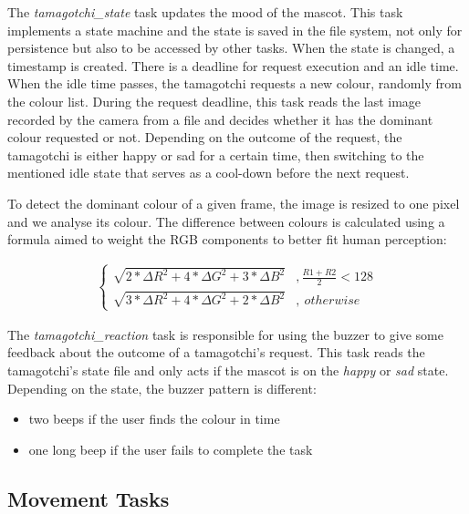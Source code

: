 \documentclass[conference]{IEEEtran}
\begin{document}
The \textit{tamagotchi\_state} task updates the mood of the mascot. This task implements a state machine and the state is saved in the file system, not only for persistence but also to be accessed by other tasks. When the state is changed, a timestamp is created. There is a deadline for request execution and an idle time. When the idle time passes, the tamagotchi requests a new colour, randomly from the colour list. During the request deadline, this task reads the last image recorded by the camera from a file and decides whether it has the dominant colour requested or not. Depending on the outcome of the request, the tamagotchi is either happy or sad for a certain time, then switching to the mentioned idle state that serves as a cool-down before the next request.

To detect the dominant colour of a given frame, the image is resized to one pixel and we analyse its colour. The difference between colours is calculated using a formula \cite{b3} aimed to weight the RGB components to better fit human perception:

\begin{equation}
    \begin{aligned}
        \left\{ 
            \begin{array}{cl} 
                \sqrt{2*\Delta R^2 + 4*\Delta G^2 + 3*\Delta B^2} & , \frac{R1 + R2}{2} < 128 \\ 
                \sqrt{3*\Delta R^2 + 4*\Delta G^2 + 2*\Delta B^2} & , \ otherwise 
            \end{array} 
        \right.
        \label{windoweq2}
    \end{aligned}
\end{equation}

The \textit{tamagotchi\_reaction} task is responsible for using the buzzer to give some feedback about the outcome of a tamagotchi's request. This task reads the tamagotchi's state file and only acts if the mascot is on the \textit{happy} or \textit{sad} state. Depending on the state, the buzzer pattern is different: 

\begin{itemize}
    \item two beeps if the user finds the colour in time
    \item one long beep if the user fails to complete the task
\end{itemize}

\subsection{Movement Tasks}
\end{document}
